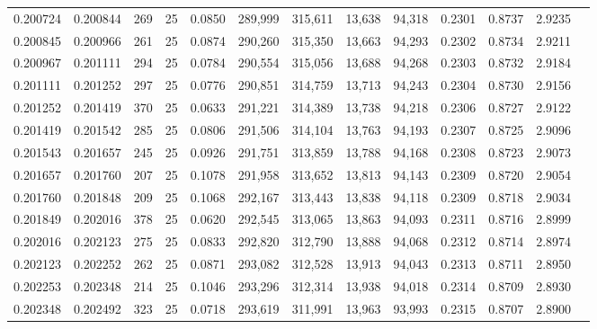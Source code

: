 \begin{tabular}{rrrrrrrrrrrrr}
0.200724 & 0.200844 &   269 &  25 &                                     0.0850 & 289,999 & 315,611 &  13,638 &  94,318 & 0.2301 & 0.8737 & 2.9235 \\
0.200845 & 0.200966 &   261 &  25 &                                     0.0874 & 290,260 & 315,350 &  13,663 &  94,293 & 0.2302 & 0.8734 & 2.9211 \\
0.200967 & 0.201111 &   294 &  25 &                                     0.0784 & 290,554 & 315,056 &  13,688 &  94,268 & 0.2303 & 0.8732 & 2.9184 \\
0.201111 & 0.201252 &   297 &  25 &                                     0.0776 & 290,851 & 314,759 &  13,713 &  94,243 & 0.2304 & 0.8730 & 2.9156 \\
0.201252 & 0.201419 &   370 &  25 &                                     0.0633 & 291,221 & 314,389 &  13,738 &  94,218 & 0.2306 & 0.8727 & 2.9122 \\
0.201419 & 0.201542 &   285 &  25 &                                     0.0806 & 291,506 & 314,104 &  13,763 &  94,193 & 0.2307 & 0.8725 & 2.9096 \\
0.201543 & 0.201657 &   245 &  25 &                                     0.0926 & 291,751 & 313,859 &  13,788 &  94,168 & 0.2308 & 0.8723 & 2.9073 \\
0.201657 & 0.201760 &   207 &  25 &                                     0.1078 & 291,958 & 313,652 &  13,813 &  94,143 & 0.2309 & 0.8720 & 2.9054 \\
0.201760 & 0.201848 &   209 &  25 &                                     0.1068 & 292,167 & 313,443 &  13,838 &  94,118 & 0.2309 & 0.8718 & 2.9034 \\
0.201849 & 0.202016 &   378 &  25 &                                     0.0620 & 292,545 & 313,065 &  13,863 &  94,093 & 0.2311 & 0.8716 & 2.8999 \\
0.202016 & 0.202123 &   275 &  25 &                                     0.0833 & 292,820 & 312,790 &  13,888 &  94,068 & 0.2312 & 0.8714 & 2.8974 \\
0.202123 & 0.202252 &   262 &  25 &                                     0.0871 & 293,082 & 312,528 &  13,913 &  94,043 & 0.2313 & 0.8711 & 2.8950 \\
0.202253 & 0.202348 &   214 &  25 &                                     0.1046 & 293,296 & 312,314 &  13,938 &  94,018 & 0.2314 & 0.8709 & 2.8930 \\
0.202348 & 0.202492 &   323 &  25 &                                     0.0718 & 293,619 & 311,991 &  13,963 &  93,993 & 0.2315 & 0.8707 & 2.8900 \\

\end{tabular}
